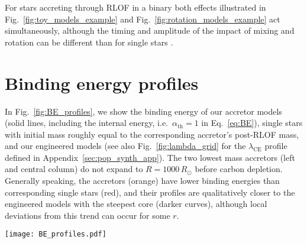 \documentclass[twocolumn,twocolappendix,trackchanges]{aastex63}
\DeclareRobustCommand{\Eqref}[1]{Eq.~\ref{#1}}
\DeclareRobustCommand{\Figref}[1]{Fig.~\ref{#1}}
\begin{document}
For stars accreting through RLOF in a binary both
effects illustrated in \Figref{fig:toy_models_example} and
\Figref{fig:rotation_models_example} act simultaneously, although the
timing and amplitude of the impact of mixing and rotation can be
different than for single stars \citep[e.g.,][]{renzo:2021zoph}.


\section{Binding energy profiles}
\label{sec:BE}

In \Figref{fig:BE_profiles}, we show the binding energy of our
accretor models (solid lines,
including the internal energy, i.e.\ $\alpha_\mathrm{th}=1$ in
\Eqref{eq:BE}),
single stars with initial mass roughly equal
to the corresponding accretor's post-RLOF mass, and our engineered models (see also
\Figref{fig:lambda_grid} for the $\lambda_\mathrm{CE}$ profile defined in Appendix~\ref{sec:pop_synth_app}). The two
lowest mass accretors (left and central column) do not expand to
$R=1000\, R_\odot$ before carbon depletion. Generally speaking, the
accretors (orange) have lower binding energies than corresponding
single stars (red), and their profiles are qualitatively closer to the
engineered models with the steepest core (darker curves), although
local deviations from this trend can occur for some $r$.

\begin{figure*}[hbtp]
  \texttt{[image: BE\_profiles.pdf]}
  \caption{Binding energy profile at fixed photospheric radius $R$
    (right y-axis) as a function of radial coordinate $r$. We only show
    profiles with $\alpha_\mathrm{th}=1$, that is accounting for the
    internal energy content of the star. Orange, red, and other colors
    show respectively the accretor models, single stars of same
    post-RLOF total mass, and engineered models with varying CEB
    steepness. Titles indicates the pre-RLOF and approximate post-RLOF
    accretor masses. The vertical colored lines mark the outer edge of
    the helium cores of the accretor and single star, that is the
    outermost location where $Y>0.1$ and $X<0.01$ (solid lines), or
    $X<0.1$ (dashed), or $X<0.2$ (dot-dashed). The
    dotted gray lines mark
    the total radius $R$ of these models.}
  \label{fig:BE_profiles}
\end{figure*}


\newpage
\end{document}
